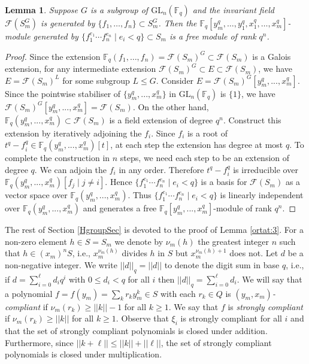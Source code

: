 \documentclass{amsart}
\newcommand{\field}{\mathbb{F}}
\newcommand{\gl}[2]{{{\text{GL}_{{#1}}(\field_{#2})}}}
\newcommand{\F}{\mathcal{F}}
\newtheorem{lem}[subsection]{Lemma}
\begin{document}
\begin{lem}
    Suppose $G$ is a subgroup of $\gl{n}{q}$ and
    the invariant field $\F(S_m^G)$ is generated by
    $\{f_1,\ldots,f_{n}\}\subset S_m^G$.
    Then the $\field_q[y_{m}^q,\dots,y_1^q,x_1^q,\ldots, x_{m}^q]$-module
  generated by $\{f_1^{e_1}\cdots f_{n}^{e_{n}}\mid e_i<q\}\subset S_{m}$
  is a free module of rank $q^{n}$.
\end{lem}

\begin{proof}  
  Since the extension $\field_q(f_1,\ldots,f_{n})=\F(S_m)^G\subset \F(S_m)$ is a Galois extension,
  for any intermediate extension $\F(S_m)^G\subset  E\subset\F(S_m)$, we have $E=\F(S_m)^L$  
  for some subgroup $L\leq G$. 
 Consider $E=\F(S_m)^G[y_m^q,...,x_m^q]$. 
Since the pointwise stabiliser of $\{y_m^q,...,x_m^q\}$ in 
$\gl{n}{q}$ is $\{1\}$,
we have $\F(S_m)^G[y_m^q,...,x_m^q]=\F(S_m)$.
On the other hand, $\field_q(y_m^q,...,x_m^q)\subset \F(S_m)$ is a field extension of degree $q^n$.
Construct this extension by iteratively adjoining the $f_{i}$. 
Since $f_{i}$ is a root of $t^q-f_{i}^q\in \field_q(y_m^q,...,x_m^q)[t]$, at each step the extension has degree at most $q$. 
To complete the construction in $n$ steps, we need each step to be an extension of degree $q$.
We can adjoin the $f_{i}$ in any order. 
Therefore $t^q-f_{i}^q$ is irreducible over $\field_q(y_m^q,...,x_m^q)[f_{j} \mid j\not=i]$.
 Hence $\{f_1^{e_1}\cdots f_{n}^{e_{n}}\mid e_i<q\}$ is a basis for $\F(S_m)$ as a vector space over
  $\field_q(y_m^q,...,x_m^q)$. Thus
  $\{f_1^{e_1}\cdots f_{n}^{e_{n}}\mid e_i<q\}$ is linearly independent over $\field_q(y_m^q,...,x_m^q)$
 and generates a free  $\field_q[y_m^q,...,x_m^q]$-module of rank $q^n$.
 \end{proof}

The rest of Section \ref{HgroupSec} is devoted to the proof of 
Lemma \ref{ortat:3}.
For a non-zero element $h \in S=S_m$ we denote by $\nu_m(h)$ the greatest integer $n$ such that $h \in (x_m)^n S$, i.e., $x_m^{\nu_m(h)}$ divides $h$ in $S$
but $x_m^{\nu_m(h)+1}$ does not.  
Let $d$ be a non-negative integer.  We write $||d||_q=||d||$ to denote the digit sum in base $q$,  i.e., if $d=\sum_{i=0}^\ell d_i q^i$ with $0 \leq d_i < q$ for all $i$
 then $||d||_q = \sum_{i=0}^\ell d_i$. 
 We will say that a polynomial $f= f(y_m)=\sum_k r_k y_m^k \in S$ with each $r_k \in Q$ is {\it $(y_m,x_m)$-compliant} 
 if $\nu_m(r_k) \geq ||k|| - 1$ for all $k \geq 1$. We say that $f$ is {\it strongly compliant} if $\nu_m(r_k) \geq ||k||$ for all $k \geq 1$.
 Observe that $\xi_{i}$ is strongly compliant for all $i$ and that the set of strongly compliant polynomials is closed under addition.
 Furthermore, since $||k+\ell||\leq ||k||+||\ell||$,  the set of strongly compliant polynomials is closed under multiplication.
\end{document}
